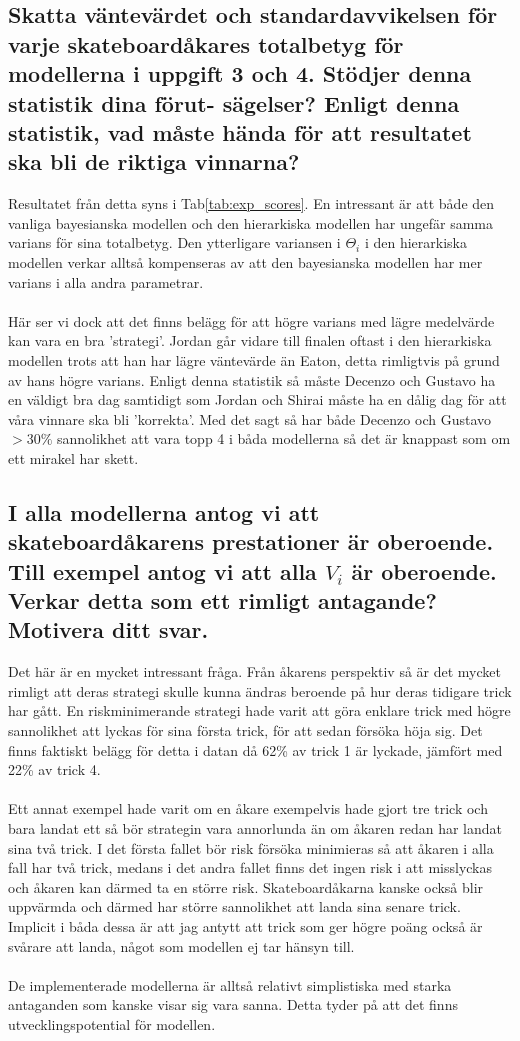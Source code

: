 \documentclass{article}
\begin{document}
\subsection{Skatta väntevärdet och standardavvikelsen för varje skateboardåkares totalbetyg för modellerna i uppgift 3 och 4. Stödjer denna statistik dina förut- sägelser? Enligt denna statistik, vad måste hända för att resultatet ska bli de riktiga vinnarna?}
Resultatet från detta syns i Tab\ref{tab:exp_scores}. En intressant är att både den vanliga bayesianska modellen och den hierarkiska modellen har ungefär samma varians för sina totalbetyg.
Den ytterligare variansen i $\Theta_i$ i den hierarkiska modellen verkar alltså kompenseras av att den bayesianska modellen har mer varians i alla andra parametrar.
\\\\
Här ser vi dock att det finns belägg för att högre varians med lägre medelvärde kan vara en bra 'strategi'.
Jordan går vidare till finalen oftast i den hierarkiska modellen trots att han har lägre väntevärde än Eaton, detta rimligtvis på grund av hans högre varians.
Enligt denna statistik så måste Decenzo och Gustavo ha en väldigt bra dag samtidigt som Jordan och Shirai måste ha en dålig dag för att våra vinnare ska bli 'korrekta'.
Med det sagt så har både Decenzo och Gustavo $>30\%$ sannolikhet att vara topp 4 i båda modellerna så det är knappast som om ett mirakel har skett.

\subsection{I alla modellerna antog vi att skateboardåkarens prestationer är oberoende. Till exempel antog vi att alla $V_i$ är oberoende. Verkar detta som ett rimligt antagande? Motivera ditt svar.}
Det här är en mycket intressant fråga. Från åkarens perspektiv så är det mycket rimligt att deras strategi skulle kunna ändras beroende på hur deras tidigare trick har gått.
En riskminimerande strategi hade varit att göra enklare trick med högre sannolikhet att lyckas för sina första trick, för att sedan försöka höja sig.
Det finns faktiskt belägg för detta i datan då 62\% av trick 1 är lyckade, jämfört med 22\% av trick 4.
\\\\
Ett annat exempel hade varit om en åkare exempelvis hade gjort tre trick och bara landat ett så bör strategin vara annorlunda än om åkaren redan har landat sina två trick.
I det första fallet bör risk försöka minimieras så att åkaren i alla fall har två trick, medans i det andra fallet finns det ingen risk i att misslyckas och åkaren kan därmed ta en större risk. 
Skateboardåkarna kanske också blir uppvärmda och därmed har större sannolikhet att landa sina senare trick. 
Implicit i båda dessa är att jag antytt att trick som ger högre poäng också är svårare att landa, något som modellen ej tar hänsyn till.
\\\\
De implementerade modellerna är alltså relativt simplistiska med starka antaganden som kanske visar sig vara sanna. Detta tyder på att det finns utvecklingspotential för modellen.
\end{document}
